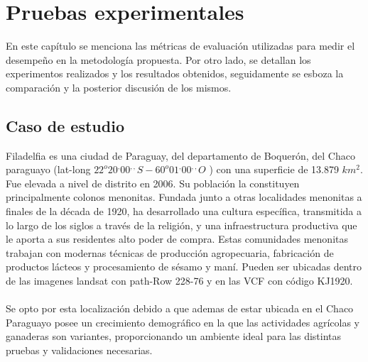 \newpage{\ } 
\thispagestyle{empty} 

\chapter{Pruebas experimentales}
En este capítulo se menciona las m\'etricas de evaluaci\'on utilizadas para medir el desempe\~{n}o en la metodolog\'ia propuesta. Por otro lado, se detallan los experimentos realizados y los resultados obtenidos, seguidamente se esboza la comparaci\'on y la posterior discusi\'on de los mismos.

\section{Caso de estudio}
Filadelfia es una ciudad de Paraguay, del departamento de Boquer\'on, del Chaco paraguayo (lat-long $22^{o}20^{,}00^{,,} S - 60^{o}01^{,} 00^{,,} O$ ) con una superficie de 13.879 $ km^{2} $. Fue elevada a nivel de distrito en 2006. Su poblaci\'on la constituyen principalmente colonos menonitas. Fundada junto a otras localidades menonitas a finales de la d\'ecada de 1920, ha desarrollado una cultura espec\'ifica, transmitida a lo largo de los siglos a trav\'es de la religi\'on, y una infraestructura productiva que le aporta a sus residentes alto poder de compra. Estas comunidades menonitas trabajan con modernas t\'ecnicas de producci\'on agropecuaria, fabricaci\'on de productos l\'acteos y procesamiento de s\'esamo y man\'i. Pueden ser ubicadas dentro de las imagenes landsat con path-Row 228-76 y en las VCF con c\'odigo KJ1920.\\~\\
Se opto por esta localizaci\'on debido a que ademas de estar ubicada en el Chaco Paraguayo posee un crecimiento demogr\'afico en la que las actividades agr\'icolas y ganaderas son variantes, proporcionando un ambiente ideal para las distintas pruebas y validaciones necesarias.\\~\\


